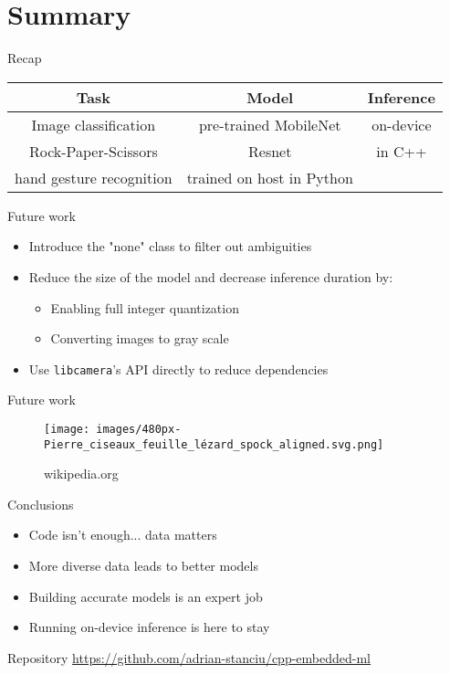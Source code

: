 
\section{Summary}

\begin{frame}{Recap}
  \begin{table}
	\begin{tabular}{|c|c|c|}
	  \hline
		\textbf{Task} & \textbf{Model} & \textbf{Inference} \\
	  \hline
		\multicolumn{1}{|c|}{Image classification} &
		pre-trained MobileNet & on-device \\
	  \cline{1-2}
		\multicolumn{1}{|c|}{Rock-Paper-Scissors} & Resnet & in C++ \\
		\multicolumn{1}{|c|}{hand gesture recognition} & trained on host in Python & \\
	  \hline
	\end{tabular}
  \end{table}
\end{frame}

\begin{frame}{Future work}
  \begin{itemize}
	\item Introduce the "none" class to filter out ambiguities
	\item Reduce the size of the model and decrease inference duration by:
	  \begin{itemize}
		\item Enabling full integer quantization
		\item Converting images to gray scale
	  \end{itemize}
	\item Use \texttt{libcamera}'s API directly to reduce dependencies
  \end{itemize}
\end{frame}

\begin{frame}{Future work}
  \begin{figure}
	\texttt{[image: images/480px-Pierre\_ciseaux\_feuille\_lézard\_spock\_aligned.svg.png]}
	\caption{wikipedia.org}
  \end{figure}
\end{frame}

\begin{frame}{Conclusions}
  \begin{itemize}
	\item Code isn't enough... data matters
	\item More diverse data leads to better models
	\item Building accurate models is an expert job
	\item Running on-device inference is here to stay
  \end{itemize}
\end{frame}

\begin{frame}{Repository}
  \url{https://github.com/adrian-stanciu/cpp-embedded-ml}
\end{frame}

